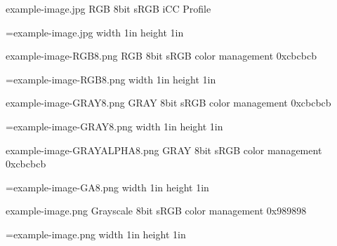 example-image.jpg RGB 8bit sRGB iCC Profile

\HINTimage=example-image.jpg width 1in height 1in \relax

example-image-RGB8.png RGB 8bit sRGB color management 0xcbcbcb

\HINTimage=example-image-RGB8.png width 1in height 1in \relax

example-image-GRAY8.png GRAY 8bit sRGB color management 0xcbcbcb

\HINTimage=example-image-GRAY8.png width 1in height 1in \relax

example-image-GRAYALPHA8.png GRAY 8bit sRGB color management 0xcbcbcb

\HINTimage=example-image-GA8.png width 1in height 1in \relax

example-image.png Grayscale 8bit sRGB color management 0x989898

\HINTimage=example-image.png width 1in height 1in \relax

\bye
